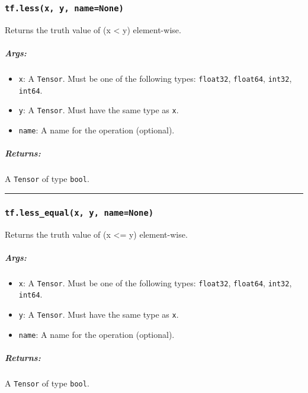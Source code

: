 \subsubsection{\texorpdfstring{\texttt{tf.less(x,\ y,\ name=None)}
}{tf.less(x, y, name=None) }}\label{tf.lessx-y-namenone}

Returns the truth value of (x \textless{} y) element-wise.

\subparagraph{Args: }\label{args-10}

\begin{itemize}
\tightlist
\item
  \texttt{x}: A \texttt{Tensor}. Must be one of the following types:
  \texttt{float32}, \texttt{float64}, \texttt{int32}, \texttt{int64}.
\item
  \texttt{y}: A \texttt{Tensor}. Must have the same type as \texttt{x}.
\item
  \texttt{name}: A name for the operation (optional).
\end{itemize}

\subparagraph{Returns: }\label{returns-10}

A \texttt{Tensor} of type \texttt{bool}.

\begin{center}\rule{0.5\linewidth}{\linethickness}\end{center}

\subsubsection{\texorpdfstring{\texttt{tf.less\_equal(x,\ y,\ name=None)}
}{tf.less\_equal(x, y, name=None) }}\label{tf.lessux5fequalx-y-namenone}

Returns the truth value of (x \textless{}= y) element-wise.

\subparagraph{Args: }\label{args-11}

\begin{itemize}
\tightlist
\item
  \texttt{x}: A \texttt{Tensor}. Must be one of the following types:
  \texttt{float32}, \texttt{float64}, \texttt{int32}, \texttt{int64}.
\item
  \texttt{y}: A \texttt{Tensor}. Must have the same type as \texttt{x}.
\item
  \texttt{name}: A name for the operation (optional).
\end{itemize}

\subparagraph{Returns: }\label{returns-11}

A \texttt{Tensor} of type \texttt{bool}.

